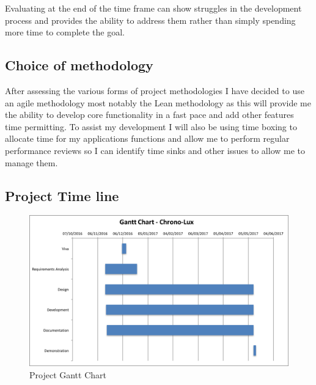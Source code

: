 Evaluating at the end of the time frame can show struggles in the
development process and provides the ability to address them rather than
simply spending more time to complete the goal.

\subsection{Choice of methodology}\label{choice-of-methodology}

After assessing the various forms of project methodologies I have
decided to use an agile methodology most notably the Lean methodology as
this will provide me the ability to develop core functionality in a fast
pace and add other features time permitting. To assist my development I
will also be using time boxing to allocate time for my applications
functions and allow me to perform regular performance reviews so I can
identify time sinks and other issues to allow me to manage them.

\subsection{Project Time line}\label{project-time-line}

\begin{landscape}
\begin{figure}[htbp]
\includegraphics{Images/gantt.png}
\caption{Project Gantt Chart}
\end{figure}
\end{landscape}
